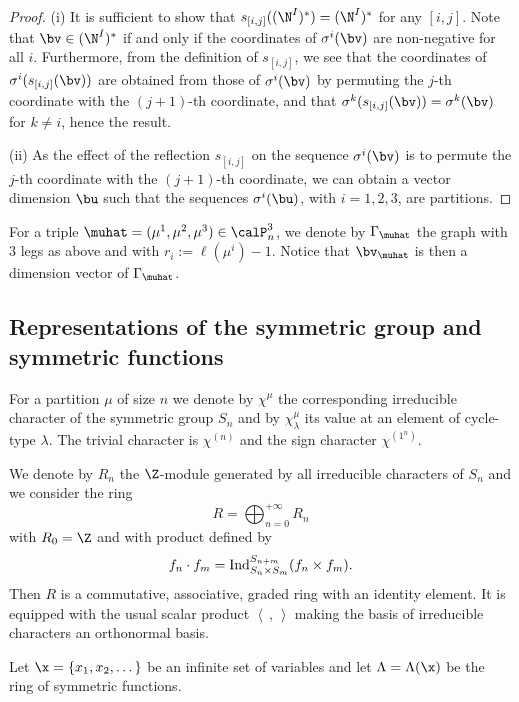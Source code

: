 \begin{proof}
	\noindent(i) It is sufficient to show that $s_{[i,j]}((\N^I)^*)=(\N^I)^*$ for any $[i,j]$. Note that $\bv\in (\N^I)^*$ if and only if the coordinates of $ \sigma^i(\bv)$ are non-negative for all $i$. 
	Furthermore, from the definition of $s_{[i,j]}$, we see that the coordinates of $\sigma^i(s_{[i,j]}(\bv))$  are obtained from those of $\sigma^i(\bv)$ by permuting the $j$-th coordinate with the $(j+1)$-th coordinate, and that $\sigma^k(s_{[i,j]}(\bv))=\sigma^k(\bv)$ for $k\neq i$, hence the result.
	
	\noindent(ii) As the effect of the reflection $s_{[i,j]}$ on the sequence $\sigma^i(\bv)$ is to permute the $j$-th coordinate with the $(j+1)$-th coordinate, we can obtain a vector dimension $\bu$ such that the sequences $\sigma^i(\bu)$, with $i=1,2,3$, are partitions.    
\end{proof}

For a triple  $\muhat=(\mu^1,\mu^2,\mu^3)\in\calP_n^3$, we denote by $\Gamma_\muhat$ the graph with $3$ legs as above and with $r_i:=\ell(\mu^i)-1$. Notice that $\bv_\muhat$ is then a dimension vector of $\Gamma_\muhat$. 




\subsection{Representations of the symmetric group and symmetric functions}\label{symmetric-section}




For a partition $\mu$ of size $n$ we denote by $\chi^\mu$ the corresponding irreducible character of the symmetric group $S_n$ and by $\chi^\mu_\lambda$ its value at an element of cycle-type $\lambda$. The trivial character is $\chi^{(n)}$ and the sign character $\chi^{(1^n)}$. 


We denote by $R_n$ the $\Z$-module generated by all irreducible characters of $S_n$  and we consider  the ring
$$
R=\bigoplus_{n=0}^{+\infty}R_n
$$
with $R_0=\Z$ and with product defined by 
$$
f_n\cdot f_m={\rm Ind}_{S_n\times S_m}^{S_{n+m}}(f_n\times f_m).
$$
Then $R$ is  a commutative, associative, graded ring with an identity element. It is equipped with the usual scalar product $\left\langle\,,\,\right\rangle$ making the basis of irreducible characters an orthonormal basis.


Let $\x=\{x_1,x_2,\dots\}$ be an infinite set of variables and let $\Lambda=\Lambda(\x)$ be the ring of symmetric functions. 

